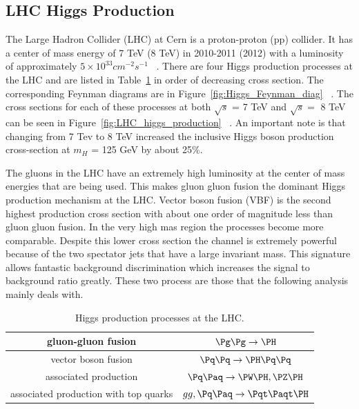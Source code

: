 \subsection{LHC Higgs Production}

The Large Hadron Collider (LHC) at Cern is a proton-proton (pp) collider.  It has a center of mass energy of 7 TeV (8 TeV) in 2010-2011 (2012) with a luminosity of approximately $5 \times 10^{33} cm^{-2}s^{-1}$ ~\cite{1748-0221-3-08-S08001}.  There are four Higgs production processes at the LHC and are listed in Table~\ref{tab:lhc_higgs_production} in order of decreasing cross section.  The corresponding Feynman diagrams are in Figure~\ref{fig:Higgs_Feynman_diag} ~\cite{Egede_Feynman_Higgs}.  The cross sections for each of these processes at both $\sqrt{s}$ = 7 TeV and $\sqrt{s} =$ 8 TeV can be seen in Figure~\ref{fig:LHC_higgs_production} ~\cite{LHC_Higgs_Gallery}.  An important note is that changing from 7 Tev to 8 TeV increased the inclusive Higgs boson production cross-section at $m_H$ = 125 GeV by about 25\%. 

The gluons in the LHC have an extremely high luminosity at the center of mass energies that are being used.  This makes gluon gluon fusion the dominant Higgs production mechanism at the LHC.  Vector boson fusion (VBF) is the second highest production cross section with about one order of magnitude less than gluon gluon fusion.  In the very high mas region the processes become more comparable.  Despite this lower cross section the channel is extremely powerful because of the two spectator jets that have a large invariant mass.  This signature allows fantastic background discrimination which increases the signal to background ratio greatly. These two process are those that the following analysis mainly deals with.



\begin{table}[htb]
\caption{%
  \small Higgs production processes at the LHC. %
}
\begin{center}
\begin{tabular}{ | c | c | }
\hline
gluon-gluon fusion & $\Pg\Pg \rightarrow \PH$ \\ \hline
vector boson fusion & $\Pq\Pq \rightarrow \PH\Pq\Pq$ \\ \hline
associated production & $\Pq\Paq \rightarrow \PW\PH,\PZ\PH$ \\ \hline
associated production with top quarks & $gg,\Pq\Paq \rightarrow \Pqt\Paqt\PH$ \\ \hline
\end{tabular}
\end{center}
\label{tab:lhc_higgs_production}
\end{table}

